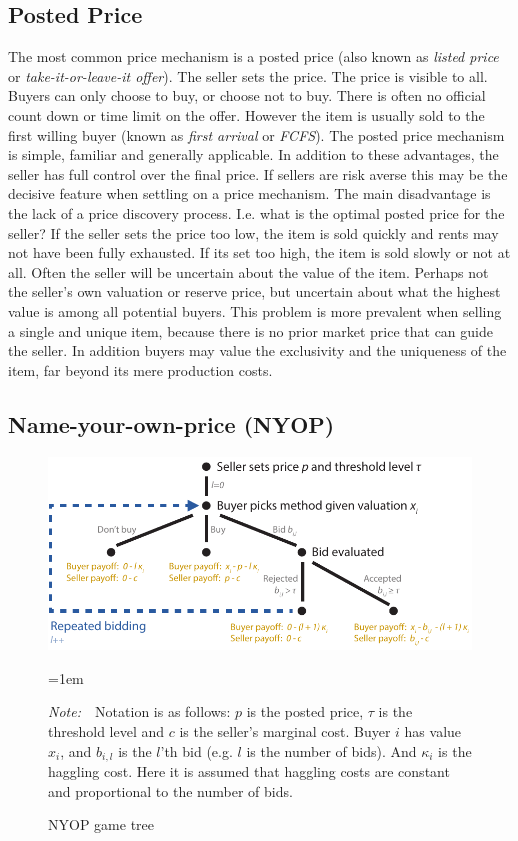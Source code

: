\documentclass[a4paper,12pt]{article}
\newcommand{\Figtext}[1]{%
	\begin{tablenotes}[para,flushleft]
		\hangindent=1em
		\footnotesize
		\raggedright
		#1
	\end{tablenotes}
}
\newcommand{\Fignote}[1]{\Figtext{\emph{Note:~}~#1}}
\begin{document}
	\subsection{Posted Price}
	The most common price mechanism is a posted price (also known as {\it listed price} or {\it take-it-or-leave-it offer}). The seller sets the price. The price is visible to all. Buyers can only choose to buy, or choose not to buy. There is often no official count down or time limit on the offer. However the item is usually sold to the first willing buyer (known as \emph{first arrival} or \emph{FCFS}). The posted price mechanism is simple, familiar and generally applicable. In addition to these advantages, the seller has full control over the final price. If sellers are risk averse this may be the decisive feature when settling on a price mechanism. The main disadvantage is the lack of a price discovery process. I.e. what is the optimal posted price for the seller? If the seller sets the price too low, the item is sold quickly and rents may not have been fully exhausted. If its set too high, the item is sold slowly or not at all. Often the seller will be uncertain about the value of the item. Perhaps not the seller's own valuation or reserve price, but uncertain about what the highest value is among all potential buyers. This problem is more prevalent when selling a single and unique item, because there is no prior market price that can guide the seller. In addition buyers may value the exclusivity and the uniqueness of the item, far beyond its mere production costs.

	\subsection{Name-your-own-price (NYOP)}

	\begin{figure}
	        \centering
	        \caption{NYOP game tree}
	        \includegraphics[width=\textwidth]{Figures/NYOP_GameTree}
			\label{fig:game_tree}
			\Fignote{Notation is as follows: $p$ is the posted price, $\tau$ is the threshold level and $c$ is the seller's marginal cost. Buyer $i$ has value $x_i$, and $b_{i,l}$ is the $l$'th bid (e.g. $l$ is the number of bids). And $\kappa_i$ is the haggling cost. Here it is assumed that haggling costs are constant and proportional to the number of bids.}
	\end{figure}
\end{document}
